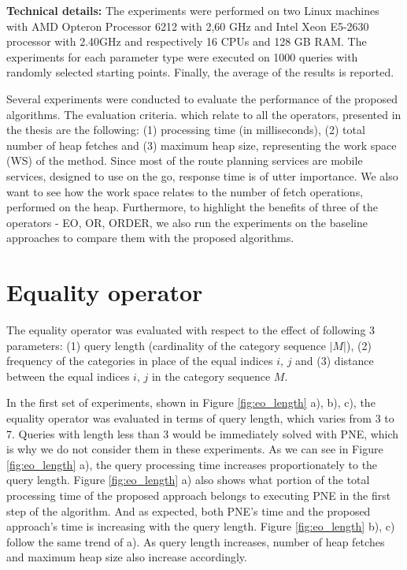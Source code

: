 \textbf{Technical details:}
The experiments were performed on two Linux machines with AMD Opteron Processor 6212 with 2,60 GHz and Intel Xeon E5-2630 processor with 2.40GHz and respectively 16 CPUs and 128 GB RAM. The experiments for each parameter type were executed on 1000 queries with randomly selected starting points. Finally, the average of the results is reported.

Several experiments were conducted to evaluate the performance of the proposed algorithms. The evaluation criteria. which relate to all the operators, presented in the thesis are the following: (1) processing time (in milliseconds), (2) total number of heap fetches and (3) maximum heap size, representing the work space (WS) of the method. Since most of the route planning services are mobile services, designed to use on the go, response time is of utter importance. We also want to see how the work space relates to the number of fetch operations, performed on the heap. Furthermore, to highlight the benefits of three of the operators - EO, OR, ORDER, we also run the experiments on the baseline approaches to compare them with the proposed algorithms. 

\section{Equality operator}
\label{sec:experimentsEO}

The equality operator was evaluated with respect to the effect of following 3 parameters: (1) query length (cardinality of the category sequence $|M|$), (2) frequency of the categories in place of the equal indices $i$, $j$ and (3) distance between the equal indices $i$, $j$ in the category sequence $M$.

In the first set of experiments, shown in Figure \ref{fig:eo_length} a), b), c), the equality operator was evaluated in terms of query length, which varies from 3 to 7. Queries with length less than 3 would be immediately solved with PNE, which is why we do not consider them in these experiments. 
As we can see in Figure \ref{fig:eo_length} a), the query processing time increases proportionately to the query length. Figure \ref{fig:eo_length} a) also shows what portion of the total processing time of the proposed approach belongs to executing PNE in the first step of the algorithm. And as expected, both PNE's time and the proposed approach's time is increasing with the query length.
Figure \ref{fig:eo_length} b), c) follow the same trend of a). As query length increases, number of heap fetches and maximum heap size also increase accordingly.

